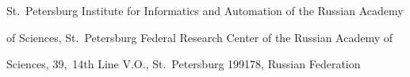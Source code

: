 \noindent


  St.\ Petersburg Institute for Informatics and Automation of the Russian Academy 


of Sciences, St.\ Petersburg Federal Research Center of the Russian Academy of 


Sciences, 39,~14th Line V.O., St.\ Petersburg 199178, Russian Federation








\def\leftfootline{\small{\textbf{\thepage}


\hfill Sistemy i Sredstva Informatiki~---


Systems and Means of Informatics 2021 vol~31 no\,4}


}%


 \def\rightfootline{\small{Sistemy i Sredstva Informatiki~---


 Systems and Means of Informatics 2021 vol~31 no\,4


\hfill \textbf{\thepage}}}





\vspace*{3pt}


  


  


    


  


